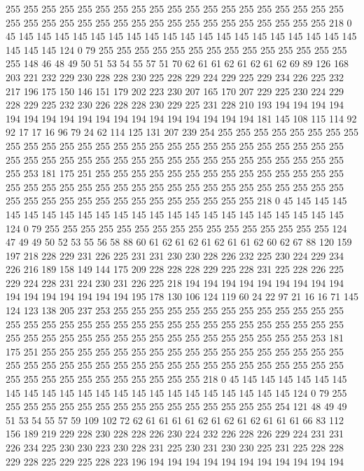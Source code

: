 255 255 255 255 255 255 255 255 255 255 255 255 255 255 255 255 255 255 255 255
255 255 255 255 255 255 255 255 255 255 255 255 255 255 255 255 255 218 0 45
145 145 145 145 145 145 145 145 145 145 145 145 145 145 145 145 145 145 145 145
145 145 124 0 79 255 255 255 255 255 255 255 255 255 255 255 255 255 255 255
148 46 48 49 50 51 53 54 55 57 51 70 62 61 61 62 61 62 61 62
69 89 126 168 203 221 232 229 230 228 228 230 225 228 229 224 229 225 229 234
226 225 232 217 196 175 150 146 151 179 202 223 230 207 165 170 207 229 225 230
224 229 228 229 225 232 230 226 228 228 230 229 225 231 228 210 193 194 194 194
194 194 194 194 194 194 194 194 194 194 194 194 194 194 194 181 145 108 115 114
92 92 17 17 16 96 79 24 62 114 125 131 207 239 254 255 255 255 255 255
255 255 255 255 255 255 255 255 255 255 255 255 255 255 255 255 255 255 255 255
255 255 255 255 255 255 255 255 255 255 255 255 255 255 255 255 255 255 255 255
255 255 253 181 175 251 255 255 255 255 255 255 255 255 255 255 255 255 255 255
255 255 255 255 255 255 255 255 255 255 255 255 255 255 255 255 255 255 255 255
255 255 255 255 255 255 255 255 255 255 255 255 255 218 0 45 145 145 145 145
145 145 145 145 145 145 145 145 145 145 145 145 145 145 145 145 145 145 124 0
79 255 255 255 255 255 255 255 255 255 255 255 255 255 255 255 255 124 47 49
49 50 52 53 55 56 58 88 60 61 62 61 62 61 62 61 61 62 60 62
67 88 120 159 197 218 228 229 231 226 225 231 231 230 230 228 226 232 225 230
224 229 234 226 216 189 158 149 144 175 209 228 228 228 229 225 228 231 225 228
226 225 229 224 228 231 224 230 231 226 225 218 194 194 194 194 194 194 194 194
194 194 194 194 194 194 194 194 195 178 130 106 124 119 60 24 22 97 21 16
16 71 145 124 123 138 205 237 253 255 255 255 255 255 255 255 255 255 255 255
255 255 255 255 255 255 255 255 255 255 255 255 255 255 255 255 255 255 255 255
255 255 255 255 255 255 255 255 255 255 255 255 255 255 255 255 255 255 253 181
175 251 255 255 255 255 255 255 255 255 255 255 255 255 255 255 255 255 255 255
255 255 255 255 255 255 255 255 255 255 255 255 255 255 255 255 255 255 255 255
255 255 255 255 255 255 255 255 255 218 0 45 145 145 145 145 145 145 145 145
145 145 145 145 145 145 145 145 145 145 145 145 145 145 124 0 79 255 255 255
255 255 255 255 255 255 255 255 255 255 255 255 255 254 121 48 49 49 51 53
54 55 57 59 109 102 72 62 61 61 61 61 62 61 62 61 62 61 61 61
66 83 112 156 189 219 229 228 230 228 228 226 230 224 232 226 228 226 229 224
231 231 226 234 225 230 230 223 230 228 231 225 230 231 230 230 225 231 225 228
228 229 228 225 229 225 228 223 196 194 194 194 194 194 194 194 194 194 194 194
